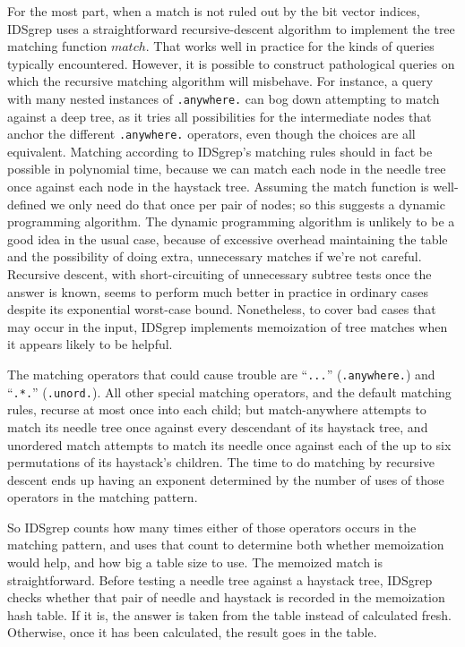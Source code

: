 \documentclass[twocolumn]{report}
\begin{document}
For the most part, when a match is not ruled out by the bit vector indices,
IDSgrep uses a straightforward recursive-descent algorithm to implement the
tree matching function $\mathit{match}$.  That works well in practice for
the kinds of queries typically encountered.  However, it is possible to
construct pathological queries on which the recursive matching algorithm
will misbehave.  For instance, a query with many nested instances of
\texttt{.anywhere.} can bog down attempting to match against a deep tree, as
it tries all possibilities for the intermediate nodes that anchor the
different \texttt{.anywhere.} operators, even though the choices are all
equivalent.
Matching according to IDSgrep's matching rules should in fact be possible in
polynomial time, because we can match each node in the needle tree once
against each node in the haystack tree.  Assuming the match function is
well-defined we only need do that once per pair of nodes; so this suggests a
dynamic programming algorithm.  The dynamic programming algorithm is
unlikely to be a good idea in the usual case, because of excessive overhead
maintaining the table and the possibility of doing extra, unnecessary
matches if we're not careful.  Recursive descent, with short-circuiting of
unnecessary subtree tests once the answer is known, seems to perform much
better in practice in ordinary cases despite its exponential worst-case
bound.  Nonetheless, to cover bad cases that may occur in the input,
IDSgrep implements memoization of tree matches when it appears likely to be
helpful.

The matching operators that could cause trouble are ``\texttt{...}''
(\texttt{.anywhere.}) and ``\texttt{.*.}'' (\texttt{.unord.}).  All other
special matching operators, and the default matching rules, recurse at most
once into each child; but match-anywhere attempts to match its needle tree
once against every descendant of its haystack tree, and unordered match
attempts to match its needle once against each of the up to six permutations
of its haystack's children.  The time to do matching by recursive descent
ends up having an exponent determined by the number of uses of those
operators in the matching pattern.

So IDSgrep counts how many times either of those operators occurs in the
matching pattern, and uses that count to determine both whether memoization
would help, and how big a table size to use.  The memoized match is
straightforward.  Before testing a needle tree against a haystack tree,
IDSgrep checks whether that pair of needle and haystack is recorded in the
memoization hash table.  If it is, the answer is taken from the table
instead of calculated fresh.  Otherwise, once it has been calculated, the
result goes in the table.
\end{document}
